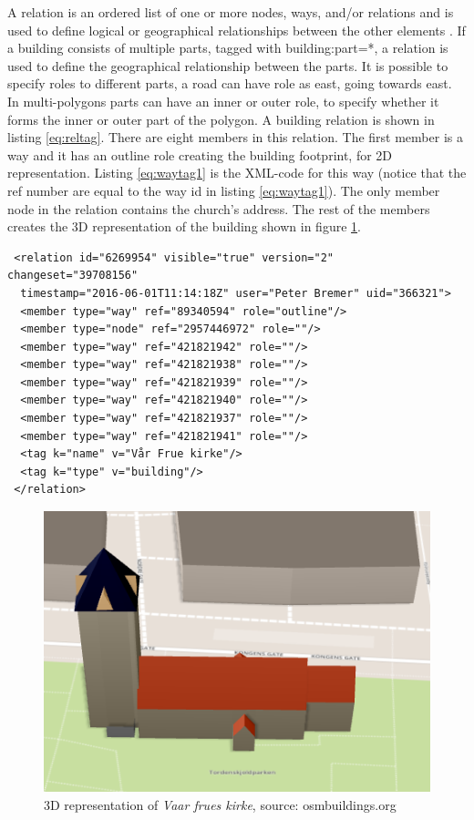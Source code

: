 A relation is an ordered list of one or more nodes, ways, and/or relations and is used to define logical or geographical relationships between the other elements \cite{OpenStreetMape}. If a building consists of multiple parts, tagged with building:part=*, a relation is used to define the geographical relationship between the parts. It is possible to specify roles to different parts, a road can have role as east, going towards east. In multi-polygons parts can have an inner or outer role, to specify whether it forms the inner or outer part of the polygon. A building relation is shown in listing \ref{eq:reltag}. There are eight members in this relation. The first member is a way and it has an outline role creating the building footprint, for 2D representation. Listing \ref{eq:waytag1} is the XML-code for this way (notice that the ref number are equal to the way id in listing \ref{eq:waytag1}). The only member node in the relation contains the church's address. The rest of the members creates the 3D representation of the building shown in figure \ref{fig:fruekirke}.

\begin{lstlisting}
 <relation id="6269954" visible="true" version="2" changeset="39708156" 
  timestamp="2016-06-01T11:14:18Z" user="Peter Bremer" uid="366321">
  <member type="way" ref="89340594" role="outline"/>
  <member type="node" ref="2957446972" role=""/>
  <member type="way" ref="421821942" role=""/>
  <member type="way" ref="421821938" role=""/>
  <member type="way" ref="421821939" role=""/>
  <member type="way" ref="421821940" role=""/>
  <member type="way" ref="421821937" role=""/>
  <member type="way" ref="421821941" role=""/>
  <tag k="name" v="Vår Frue kirke"/>
  <tag k="type" v="building"/>
 </relation>
\end{lstlisting}

\begin{figure}[H]
    \centering
    \includegraphics[scale=0.5]{figures/FixedByMe/fruekirke.png}
    \caption{3D representation of \textit{Vaar frues kirke}, source: osmbuildings.org}
    \label{fig:fruekirke}
\end{figure}


